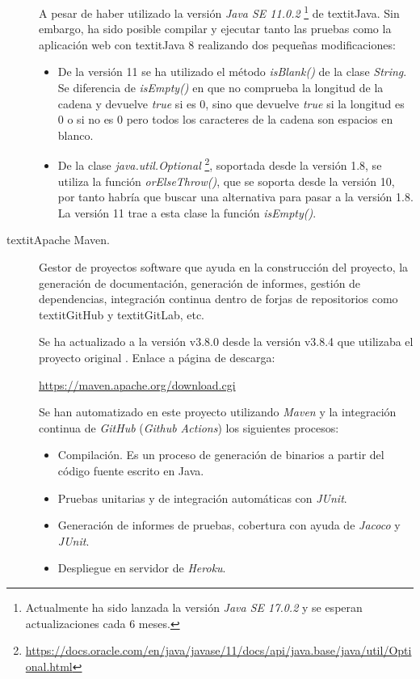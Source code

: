 \begin{description}
		A pesar de haber utilizado la versión \textit{Java SE 11.0.2} \footnote{Actualmente ha sido lanzada la versión \textit{Java SE 17.0.2} y se esperan actualizaciones cada 6 meses.} de textit{Java}. Sin embargo, ha sido posible compilar y ejecutar tanto las pruebas como la aplicación web con textit{Java 8} realizando dos pequeñas modificaciones:
		\begin{itemize}
			\item De la versión 11 se ha utilizado el método \textit{isBlank()} de la clase \textit{String}. Se diferencia de \textit{isEmpty()} en que no comprueba la longitud de la cadena y devuelve \textit{true} si es 0, sino que devuelve \textit{true} si la longitud es 0 o si no es 0 pero todos los caracteres de la cadena son espacios en blanco.
			\item De la clase \textit{java.util.Optional} \footnote{\url{https://docs.oracle.com/en/java/javase/11/docs/api/java.base/java/util/Optional.html}}, soportada desde la versión 1.8, se utiliza la función \textit{orElseThrow()}, que se soporta desde la versión 10, por tanto habría que buscar una alternativa para pasar a la versión 1.8. La versión 11 trae a esta clase la función \textit{isEmpty()}.
		\end{itemize}
	\item[textit{Apache Maven}.] Gestor de proyectos software que ayuda en la construcción del proyecto, la generación de documentación, generación de informes, gestión de dependencias, integración continua dentro de forjas de repositorios como textit{GitHub} y textit{GitLab}, etc. 
	
		Se ha actualizado a la versión v3.8.0 desde la versión  v3.8.4 que utilizaba el proyecto original \cite{TFGPrevio}. Enlace a página de descarga:
		
		\url{https://maven.apache.org/download.cgi}
		
		Se han automatizado en este proyecto utilizando \textit{Maven} y la integración continua de \textit{GitHub} (\textit{Github Actions}) los siguientes procesos:
		\begin{itemize}
			\item Compilación. Es un proceso de generación de binarios a partir del código fuente escrito en Java.
			\item Pruebas unitarias y de integración automáticas con \textit{JUnit}.
			\item Generación de informes de pruebas, cobertura con ayuda de \textit{Jacoco} y \textit{JUnit}.
			\item Despliegue en servidor de \textit{Heroku}.
		\end{itemize}
	

\end{description}
